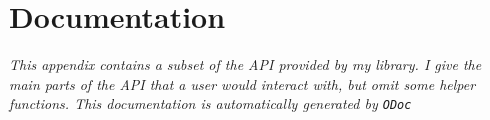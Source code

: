 \chapter{Documentation} \label{app:docs}
\textit{This appendix contains a subset of the API provided by my library. I give the main parts of the API that a user would interact with, but omit some helper functions. This documentation is automatically generated by \texttt{ODoc}}



